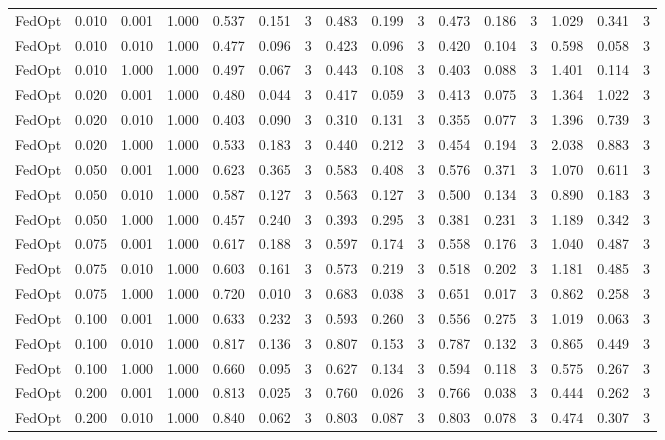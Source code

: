 \begin{table}[htbp]
\begin{tabular}{lccccccccccccccc}
FedOpt & 0.010 & 0.001 & 1.000 & 0.537 & 0.151 & 3 & 0.483 & 0.199 & 3 & 0.473 & 0.186 & 3 & 1.029 & 0.341 & 3 \\
FedOpt & 0.010 & 0.010 & 1.000 & 0.477 & 0.096 & 3 & 0.423 & 0.096 & 3 & 0.420 & 0.104 & 3 & 0.598 & 0.058 & 3 \\
FedOpt & 0.010 & 1.000 & 1.000 & 0.497 & 0.067 & 3 & 0.443 & 0.108 & 3 & 0.403 & 0.088 & 3 & 1.401 & 0.114 & 3 \\
FedOpt & 0.020 & 0.001 & 1.000 & 0.480 & 0.044 & 3 & 0.417 & 0.059 & 3 & 0.413 & 0.075 & 3 & 1.364 & 1.022 & 3 \\
FedOpt & 0.020 & 0.010 & 1.000 & 0.403 & 0.090 & 3 & 0.310 & 0.131 & 3 & 0.355 & 0.077 & 3 & 1.396 & 0.739 & 3 \\
FedOpt & 0.020 & 1.000 & 1.000 & 0.533 & 0.183 & 3 & 0.440 & 0.212 & 3 & 0.454 & 0.194 & 3 & 2.038 & 0.883 & 3 \\
FedOpt & 0.050 & 0.001 & 1.000 & 0.623 & 0.365 & 3 & 0.583 & 0.408 & 3 & 0.576 & 0.371 & 3 & 1.070 & 0.611 & 3 \\
FedOpt & 0.050 & 0.010 & 1.000 & 0.587 & 0.127 & 3 & 0.563 & 0.127 & 3 & 0.500 & 0.134 & 3 & 0.890 & 0.183 & 3 \\
FedOpt & 0.050 & 1.000 & 1.000 & 0.457 & 0.240 & 3 & 0.393 & 0.295 & 3 & 0.381 & 0.231 & 3 & 1.189 & 0.342 & 3 \\
FedOpt & 0.075 & 0.001 & 1.000 & 0.617 & 0.188 & 3 & 0.597 & 0.174 & 3 & 0.558 & 0.176 & 3 & 1.040 & 0.487 & 3 \\
FedOpt & 0.075 & 0.010 & 1.000 & 0.603 & 0.161 & 3 & 0.573 & 0.219 & 3 & 0.518 & 0.202 & 3 & 1.181 & 0.485 & 3 \\
FedOpt & 0.075 & 1.000 & 1.000 & 0.720 & 0.010 & 3 & 0.683 & 0.038 & 3 & 0.651 & 0.017 & 3 & 0.862 & 0.258 & 3 \\
FedOpt & 0.100 & 0.001 & 1.000 & 0.633 & 0.232 & 3 & 0.593 & 0.260 & 3 & 0.556 & 0.275 & 3 & 1.019 & 0.063 & 3 \\
FedOpt & 0.100 & 0.010 & 1.000 & 0.817 & 0.136 & 3 & 0.807 & 0.153 & 3 & 0.787 & 0.132 & 3 & 0.865 & 0.449 & 3 \\
FedOpt & 0.100 & 1.000 & 1.000 & 0.660 & 0.095 & 3 & 0.627 & 0.134 & 3 & 0.594 & 0.118 & 3 & 0.575 & 0.267 & 3 \\
FedOpt & 0.200 & 0.001 & 1.000 & 0.813 & 0.025 & 3 & 0.760 & 0.026 & 3 & 0.766 & 0.038 & 3 & 0.444 & 0.262 & 3 \\
FedOpt & 0.200 & 0.010 & 1.000 & 0.840 & 0.062 & 3 & 0.803 & 0.087 & 3 & 0.803 & 0.078 & 3 & 0.474 & 0.307 & 3 \\

\end{tabular}
\end{table}
